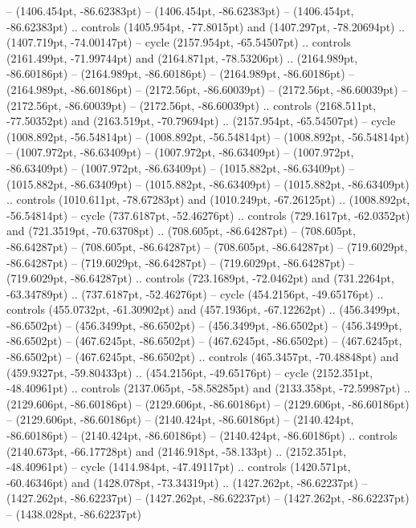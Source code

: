  -- (1406.454pt, -86.62383pt)
 -- (1406.454pt, -86.62383pt)
 -- (1406.454pt, -86.62383pt) .. controls (1405.954pt, -77.8015pt) and (1407.297pt, -78.20694pt) .. (1407.719pt, -74.00147pt) -- cycle
(2157.954pt, -65.54507pt) .. controls (2161.499pt, -71.99744pt) and (2164.871pt, -78.53206pt) .. (2164.989pt, -86.60186pt)
 -- (2164.989pt, -86.60186pt)
 -- (2164.989pt, -86.60186pt)
 -- (2164.989pt, -86.60186pt)
 -- (2172.56pt, -86.60039pt)
 -- (2172.56pt, -86.60039pt)
 -- (2172.56pt, -86.60039pt)
 -- (2172.56pt, -86.60039pt) .. controls (2168.511pt, -77.50352pt) and (2163.519pt, -70.79694pt) .. (2157.954pt, -65.54507pt) -- cycle
(1008.892pt, -56.54814pt) -- (1008.892pt, -56.54814pt)
 -- (1008.892pt, -56.54814pt)
 -- (1007.972pt, -86.63409pt)
 -- (1007.972pt, -86.63409pt)
 -- (1007.972pt, -86.63409pt)
 -- (1007.972pt, -86.63409pt)
 -- (1015.882pt, -86.63409pt)
 -- (1015.882pt, -86.63409pt)
 -- (1015.882pt, -86.63409pt)
 -- (1015.882pt, -86.63409pt) .. controls (1010.611pt, -78.67283pt) and (1010.249pt, -67.26125pt) .. (1008.892pt, -56.54814pt) -- cycle
(737.6187pt, -52.46276pt) .. controls (729.1617pt, -62.0352pt) and (721.3519pt, -70.63708pt) .. (708.605pt, -86.64287pt)
 -- (708.605pt, -86.64287pt)
 -- (708.605pt, -86.64287pt)
 -- (708.605pt, -86.64287pt)
 -- (719.6029pt, -86.64287pt)
 -- (719.6029pt, -86.64287pt)
 -- (719.6029pt, -86.64287pt)
 -- (719.6029pt, -86.64287pt) .. controls (723.1689pt, -72.0462pt) and (731.2264pt, -63.34789pt) .. (737.6187pt, -52.46276pt) -- cycle
(454.2156pt, -49.65176pt) .. controls (455.0732pt, -61.30902pt) and (457.1936pt, -67.12262pt) .. (456.3499pt, -86.6502pt)
 -- (456.3499pt, -86.6502pt)
 -- (456.3499pt, -86.6502pt)
 -- (456.3499pt, -86.6502pt)
 -- (467.6245pt, -86.6502pt)
 -- (467.6245pt, -86.6502pt)
 -- (467.6245pt, -86.6502pt)
 -- (467.6245pt, -86.6502pt) .. controls (465.3457pt, -70.48848pt) and (459.9327pt, -59.80433pt) .. (454.2156pt, -49.65176pt) -- cycle
(2152.351pt, -48.40961pt) .. controls (2137.065pt, -58.58285pt) and (2133.358pt, -72.59987pt) .. (2129.606pt, -86.60186pt)
 -- (2129.606pt, -86.60186pt)
 -- (2129.606pt, -86.60186pt)
 -- (2129.606pt, -86.60186pt)
 -- (2140.424pt, -86.60186pt)
 -- (2140.424pt, -86.60186pt)
 -- (2140.424pt, -86.60186pt)
 -- (2140.424pt, -86.60186pt) .. controls (2140.673pt, -66.17728pt) and (2146.918pt, -58.133pt) .. (2152.351pt, -48.40961pt) -- cycle
(1414.984pt, -47.49117pt) .. controls (1420.571pt, -60.46346pt) and (1428.078pt, -73.34319pt) .. (1427.262pt, -86.62237pt)
 -- (1427.262pt, -86.62237pt)
 -- (1427.262pt, -86.62237pt)
 -- (1427.262pt, -86.62237pt)
 -- (1438.028pt, -86.62237pt)
